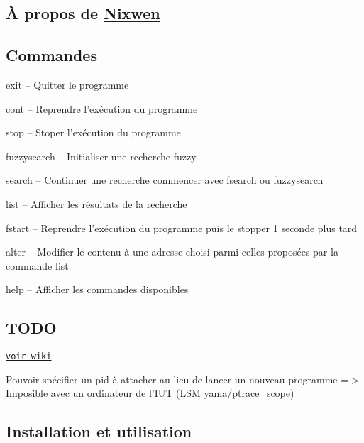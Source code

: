\subsection*{À propos de \hyperlink{classNixwen}{Nixwen}}

\subsection*{Commandes}


\begin{DoxyItemize}
\item {\ttfamily exit} -- Quitter le programme
\item {\ttfamily cont} -- Reprendre l'exécution du programme
\item {\ttfamily stop} -- Stoper l'exécution du programme
\item {\ttfamily fuzzysearch} -- Initialiser une recherche fuzzy
\item {\ttfamily search} -- Continuer une recherche commencer avec fsearch ou fuzzysearch
\item {\ttfamily list} -- Afficher les résultats de la recherche
\item {\ttfamily fstart} -- Reprendre l'exécution du programme puis le stopper 1 seconde plus tard
\item {\ttfamily alter} -- Modifier le contenu à une adresse choisi parmi celles proposées par la commande list
\item {\ttfamily help} -- Afficher les commandes disponibles
\end{DoxyItemize}

\subsection*{T\-O\-D\-O}


\begin{DoxyItemize}
\item \href{https://github.com/IUT-MemScanner/nixwen/wiki/projet-S4}{\tt voir wiki}
\item Pouvoir spécifier un pid à attacher au lieu de lancer un nouveau programme =$>$ Imposible avec un ordinateur de l'I\-U\-T (L\-S\-M yama/ptrace\-\_\-scope)
\end{DoxyItemize}

\subsection*{Installation et utilisation}

